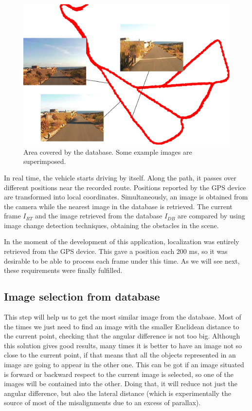 \begin{figure}[thb]
  \centering
  \includegraphics{database}
  \caption{Area covered by the database. Some example images are superimposed.}
  \label{fig:cp01_image_database}
\end{figure}

In real time, the vehicle starts driving by itself. Along the path, it passes over different positions near the recorded route. Positions reported by the \acs{GPS} device are transformed into local coordinates. Simultaneously, an image is obtained from the camera while the nearest image in the database is retrieved. The current frame $I_{RT}$ and the image retrieved from the database $I_{DB}$ are compared by using image change detection techniques, obtaining the obstacles in the scene.

In the moment of the development of this application, localization was entirely retrieved from the \acs{GPS} device. This gave a position each 200 ms, so it was desirable to be able to process each frame under this time. As we will see next, these requirements were finally fulfilled.

\subsection{Image selection from database}\label{ch:chapter01_01_01}

This step will help us to get the most similar image from the database. Most of the times we just need to find an image with the smaller Euclidean distance to the current point, checking that the angular difference is not too big. Although this solution gives good results, many times it is better to have an image not so close to the current point, if that means that all the objects represented in an image are going to appear in the other one. This can be got if an image situated is forward or backward respect to the current image is selected, so one of the images will be contained into the other. Doing that, it will reduce not just the angular difference, but also the lateral distance (which is experimentally the source of most of the misalignments due to an excess of parallax).

